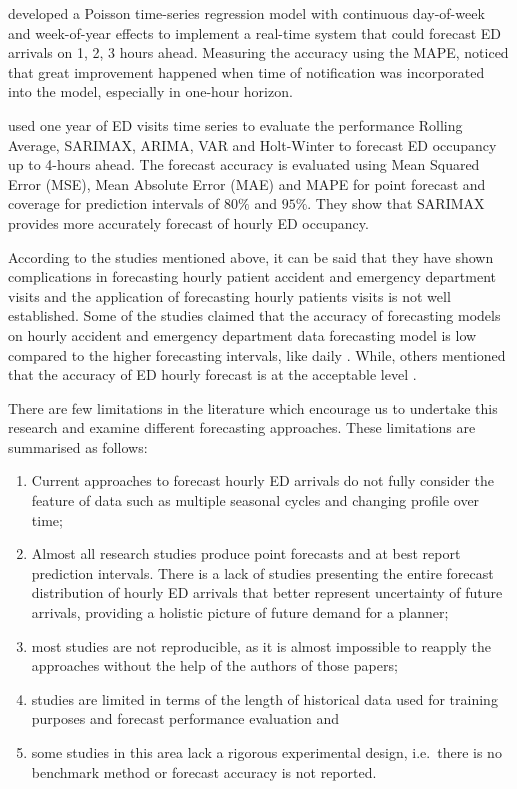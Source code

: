 \documentclass[]{elsarticle} %
\providecommand{\tightlist}{%
  \setlength{\itemsep}{0pt}\setlength{\parskip}{0pt}}
\begin{document}
\citet{asheim2019real} developed a Poisson time-series regression model with continuous day-of-week and week-of-year effects to implement a real-time system that could forecast ED arrivals on 1, 2, 3 hours ahead. Measuring the accuracy using the MAPE, \citet{asheim2019real} noticed that great improvement happened when time of notification was incorporated into the model, especially in one-hour horizon.

\citet{cheng2021forecasting} used one year of ED visits time series to evaluate the performance Rolling Average, SARIMAX, ARIMA, VAR and Holt-Winter to forecast ED occupancy up to 4-hours ahead. The forecast accuracy is evaluated using Mean Squared Error (MSE), Mean Absolute Error (MAE) and MAPE for point forecast and coverage for prediction intervals of \(80\%\) and \(95\%\). They show that SARIMAX provides more accurately forecast of hourly ED occupancy.

According to the studies mentioned above, it can be said that they have shown complications in forecasting hourly patient accident and emergency department visits and the application of forecasting hourly patients visits is not well established. Some of the studies claimed that the accuracy of forecasting models on hourly accident and emergency department data forecasting model is low compared to the higher forecasting intervals, like daily \citep{boyle2012predicting, hertzum2017forecasting}. While, others mentioned that the accuracy of ED hourly forecast is at the acceptable level \citep{choudhury2020forecasting, mccarthy2008challenge, schweigler2009forecasting}.

There are few limitations in the literature which encourage us to undertake this research and examine different forecasting approaches. These limitations are summarised as follows:

\begin{enumerate}
\def\labelenumi{(\roman{enumi})}
\tightlist
\item
  Current approaches to forecast hourly ED arrivals do not fully consider the feature of data such as multiple seasonal cycles and changing profile over time;
\item
  Almost all research studies produce point forecasts and at best report prediction intervals. There is a lack of studies presenting the entire forecast distribution of hourly ED arrivals that better represent uncertainty of future arrivals, providing a holistic picture of future demand for a planner;
\item
  most studies are not reproducible, as it is almost impossible to reapply the approaches without the help of the authors of those papers;
\item
  studies are limited in terms of the length of historical data used for training purposes and forecast performance evaluation and
\item
  some studies in this area lack a rigorous experimental design, i.e.~there is no benchmark method or forecast accuracy is not reported.
\end{enumerate}
\end{document}

